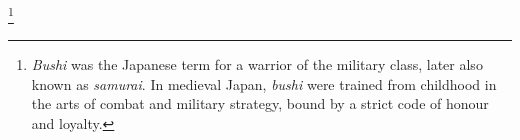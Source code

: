 \footnote{\textit{Bushi} was the Japanese term for a warrior of the military class, later also known as \textit{samurai}. In medieval Japan, \textit{bushi} were trained from childhood in the arts of combat and military strategy, bound by a strict code of honour and loyalty.}
